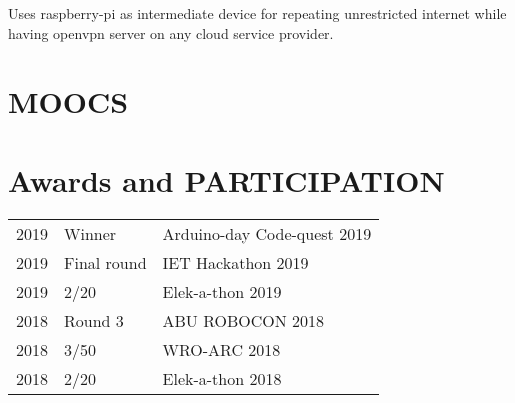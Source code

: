 \documentclass[]{deedy-resume-openfont}
\begin{document}
\begin{minipage}[t][18cm]{0.66\textwidth}
Uses raspberry-pi as intermediate device for repeating unrestricted internet while having openvpn server on any cloud service provider.
\sectionsep


\section{MOOCS}
\sectionsep

\section{Awards and PARTICIPATION} 
\begin{tabular}{rll}
2019	     & Winner  & Arduino-day Code-quest 2019\\
2019	     & Final round  & IET Hackathon 2019\\
2019	     & 2/20  & Elek-a-thon 2019\\
2018	     & Round 3  & ABU ROBOCON 2018\\
2018	     & 3/50  & WRO-ARC 2018\\
2018	     & 2/20  & Elek-a-thon 2018\\
\end{tabular}
\sectionsep


% 
% 

\end{minipage} 
\end{document}
